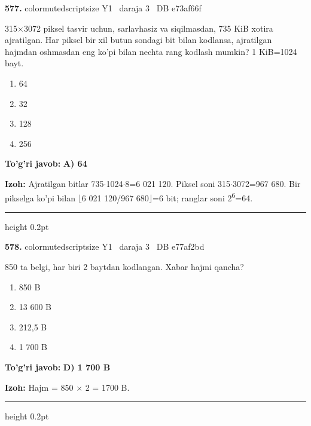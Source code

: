 \documentclass[10pt,a4paper,oneside]{article}
\begin{document}
\noindent\textbf{\color{ink}577.}  {color{muted}scriptsize Y1 \textbullet\ daraja 3 \textbullet\ DB e73af66f}
\par
315\ensuremath{\times}3072 piksel tasvir uchun, sarlavhasiz va siqilmasdan, 735 KiB xotira ajratilgan. Har piksel bir xil butun sondagi bit bilan kodlansa, ajratilgan hajmdan oshmasdan eng ko'pi bilan nechta rang kodlash mumkin? 1 KiB=1024 bayt.
\begin{enumerate}[label=\Alph*),leftmargin=9mm]
\item 64
\item 32
\item 128
\item 256
\end{enumerate}
\begin{tcolorbox}[enhanced,breakable,colback=teal!4,colframe=teal!50!black,boxrule=0.5pt,arc=1.1mm,left=3mm,right=3mm,top=1.7mm,bottom=1.7mm,before skip=2mm,after skip=2mm]
\textbf{\color{teal}To'g'ri javob:} \textbf{A) 64}
\par\smallskip
\textbf{Izoh:} Ajratilgan bitlar 735\ensuremath{\cdot}1024\ensuremath{\cdot}8=6 021 120. Piksel soni 315\ensuremath{\cdot}3072=967 680. Bir pikselga ko'pi bilan \ensuremath{\lfloor}6 021 120/967 680\ensuremath{\rfloor}=6 bit; ranglar soni 2\textsuperscript{6}=64.
\end{tcolorbox}
\vspace{2mm}\hrule height 0.2pt \vspace{3mm}

\noindent\textbf{\color{ink}578.}  {color{muted}scriptsize Y1 \textbullet\ daraja 3 \textbullet\ DB e77af2bd}
\par
850 ta belgi, har biri 2 baytdan kodlangan. Xabar hajmi qancha?
\begin{enumerate}[label=\Alph*),leftmargin=9mm]
\item 850 B
\item 13 600 B
\item 212,5 B
\item 1 700 B
\end{enumerate}
\begin{tcolorbox}[enhanced,breakable,colback=teal!4,colframe=teal!50!black,boxrule=0.5pt,arc=1.1mm,left=3mm,right=3mm,top=1.7mm,bottom=1.7mm,before skip=2mm,after skip=2mm]
\textbf{\color{teal}To'g'ri javob:} \textbf{D) 1 700 B}
\par\smallskip
\textbf{Izoh:} Hajm = 850 \ensuremath{\times} 2 = 1700 B.
\end{tcolorbox}
\vspace{2mm}\hrule height 0.2pt \vspace{3mm}
\end{document}
